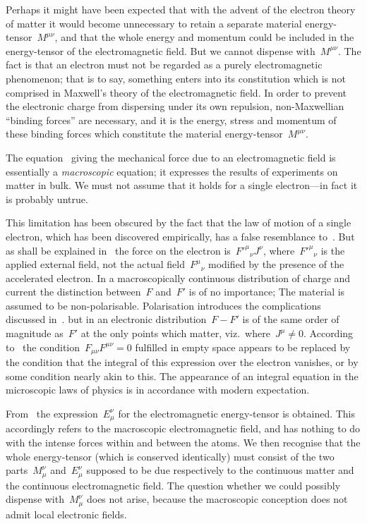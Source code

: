 \documentclass[12pt]{book}
\begin{document}
Perhaps it might have been expected that with the advent of the electron
%
theory of matter it would become unnecessary to retain a separate material
energy\hyp{}tensor~$M^{\mu\nu}$, and that the whole energy and momentum could be
included in the energy\hyp{}tensor of the electromagnetic field. But we cannot
dispense with~$M^{\mu\nu}$. The fact is that an electron must not be regarded as a
purely electromagnetic phenomenon; that is to say, something enters into its
constitution which is not comprised in Maxwell's theory of the electromagnetic
field. In order to prevent the electronic charge from dispersing under its own
repulsion, non\hyp{}Maxwellian ``binding forces'' are necessary, and it is the energy,
stress and momentum of these binding forces which constitute the material
energy\hyp{}tensor~$M^{\mu\nu}$.

The equation~ giving the mechanical force due to an electromagnetic field is essentially a
\emph{macroscopic} equation; it expresses the results of experiments on matter in bulk.
We must not assume that it holds for a single electron---in fact it is probably untrue.

This limitation has been obscured by the fact that the law of motion of a single electron, which has been
discovered empirically, has a false resemblance to~.
But as shall be explained in~ the force on the electron is~${F'^\mu}_\nu J^\nu$, where~${F'^\mu}_\nu$ is
the applied external field, not the actual field~${F^\mu}_\nu$ modified by the presence of the accelerated electron.
In a macroscopically continuous distribution of charge and current the distinction between~$F$ and~$F'$ is of no
importance\footnotemark;\footnotetext
            {The material is assumed to be non\hyp{}polarisable.
             Polarisation introduces the complications discussed in~.}
but in an electronic distribution~$F-F'$ is of the same order of magnitude as~$F'$ at the only points which matter,
viz.\ where~$J^\mu\neq 0$. According to~ the condition~$F_{\mu\nu}F^{\mu\nu}=0$ fulfilled in empty space
appears to be replaced by the condition that the integral of this expression over the electron vanishes,
or by some condition nearly akin to this.
The appearance of an integral equation in the microscopic laws of physics is in accordance with modern expectation.

From~ the expression~$E^\nu_\mu$ for the electromagnetic energy\hyp{}tensor is obtained.
This accordingly refers to the macroscopic electromagnetic field, and has nothing to do with the intense
forces within and between the atoms.
We then recognise that the whole energy\hyp{}tensor (which is conserved identically) must consist of the two
parts~$M^\nu_\mu$ and~$E^\nu_\mu$ supposed to be due respectively to the continuous matter and the continuous
electromagnetic field.
The question whether we could possibly dispense with~$M^\nu_\mu$ does not arise, because the macroscopic
conception does not admit local electronic fields.
\end{document}
